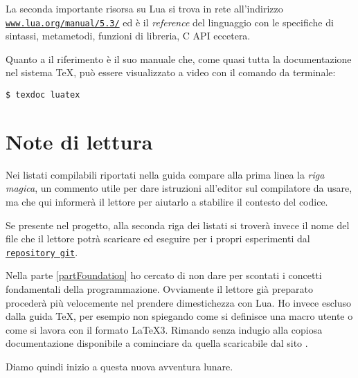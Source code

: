 La seconda importante risorsa su Lua si trova in rete all'indirizzo
\href{https://www.lua.org/manual/5.3/}{\texttt{www.lua.org/manual/5.3/}} ed è il
\emph{reference} del linguaggio \cite{web:luaref} con le specifiche di sintassi,
metametodi, funzioni di libreria, C API eccetera.

Quanto a \LuaTeX{} il riferimento è il suo manuale \cite{prg:luatex} che, come
quasi tutta la documentazione nel sistema \TeX{}, può essere visualizzato a
video con il comando da terminale:
\begin{Verbatim}[numbers=none]
$ texdoc luatex
\end{Verbatim}


\section{Note di lettura}

Nei listati compilabili riportati nella guida compare alla prima linea la
\emph{riga magica}, un commento utile per dare istruzioni all'editor sul
compilatore da usare, ma che qui informerà il lettore per aiutarlo a stabilire
il contesto del codice.

Se presente nel progetto, alla seconda riga dei listati si troverà invece il
nome del file che il lettore potrà scaricare ed eseguire per i propri
esperimenti dal \href{https://github.com/GuITeX/guidalua}{\texttt{repository
git}}.

Nella parte \ref{partFoundation} ho cercato di non dare per scontati i concetti
fondamentali della programmazione. Ovviamente il lettore già preparato procederà
più velocemente nel prendere dimestichezza con Lua. Ho invece escluso dalla
guida \TeX{}, per esempio non spiegando come si definisce una macro utente o
come si lavora con il formato \LaTeX3. Rimando senza indugio alla copiosa
documentazione disponibile a cominciare da quella scaricabile dal sito \GuIT.

Diamo quindi inizio a questa nuova avventura lunare.

